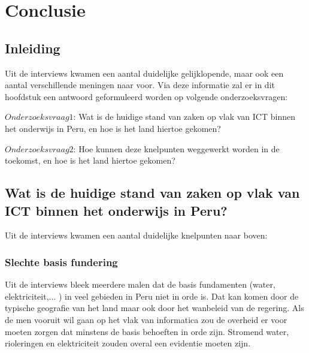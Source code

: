 

\chapter{Conclusie}
\label{ch:conclusie}


\section{Inleiding}
Uit de interviews kwamen een aantal duidelijke gelijklopende, maar ook een aantal verschillende meningen naar voor. Via deze informatie zal er in dit hoofdstuk een antwoord geformuleerd worden op volgende onderzoeksvragen:

$Onderzoeksvraag 1$: Wat is de huidige stand van zaken op vlak van ICT binnen het onderwijs in Peru, en hoe is het land hiertoe gekomen?

$Onderzoeksvraag 2$: Hoe kunnen deze knelpunten weggewerkt worden in de toekomst, en hoe is het land hiertoe gekomen?

\section{Wat is de huidige stand van zaken op vlak van ICT binnen het onderwijs in Peru?}
Uit de interviews kwamen een aantal duidelijke knelpunten naar boven:



\subsection{Slechte basis fundering}
Uit de interviews bleek meerdere malen dat de basis fundamenten (water, elektriciteit,... ) in veel gebieden in Peru niet in orde is. Dat kan komen door de typische geografie van het land maar ook door het wanbeleid van de regering. Als de men vooruit wil gaan op het vlak van informatica zou de overheid er voor moeten zorgen dat minstens de basis behoeften in orde zijn. Stromend water, rioleringen en elektriciteit zouden overal een evidentie moeten zijn.


